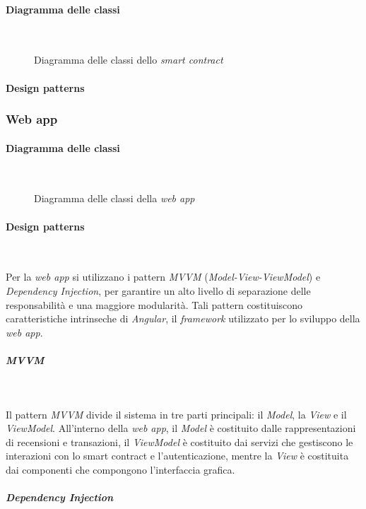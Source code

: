 \paragraph{Diagramma delle classi}~
\begin{figure}[H]
    
    \caption{Diagramma delle classi dello \textit{smart contract}}\label{fig:contract}
\end{figure}
\paragraph{Design patterns}

\subsubsection{Web app}
\paragraph{Diagramma delle classi}~
\begin{figure}[H]
    
    \caption{Diagramma delle classi della \textit{web app}}\label{fig:webapp}
\end{figure}
\paragraph{Design patterns}~

\noindent Per la \textit{web app} si utilizzano i pattern \textit{MVVM} (\textit{Model-View-ViewModel}) e \textit{Dependency Injection}, per garantire un alto livello di separazione delle responsabilità e una maggiore modularità. Tali pattern costituiscono caratteristiche intrinseche di \textit{Angular}, il \textit{framework} utilizzato per lo sviluppo della \textit{web app}.

\subparagraph{MVVM}~

\noindent Il pattern \textit{MVVM} divide il sistema in tre parti principali: il \textit{Model}, la \textit{View} e il \textit{ViewModel}. All'interno della \textit{web app}, il \textit{Model} è costituito dalle rappresentazioni di recensioni e transazioni, il \textit{ViewModel} è costituito dai servizi che gestiscono le interazioni con lo smart contract e l'autenticazione, mentre la \textit{View} è costituita dai componenti che compongono l'interfaccia grafica.

\subparagraph{Dependency Injection}~


